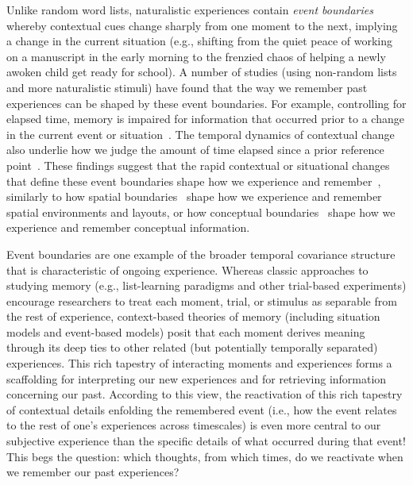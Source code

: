 \documentclass{article}
\begin{document}
Unlike random word lists, naturalistic experiences contain \textit{event boundaries} whereby contextual cues change sharply from one moment to the next, implying a change in the current situation (e.g., shifting from the quiet peace of working on a manuscript in the early morning to the frenzied chaos of helping a newly awoken child get ready for school).  A number of studies (using non-random lists and more naturalistic stimuli) have found that the way we remember past experiences can be shaped by these event boundaries.  For example, controlling for elapsed time, memory is impaired for information that occurred prior to a change in the current event or situation~\citep[e.g., ][]{RadvCope06, SwalEtal09, SwalEtal11, EzzyDava11, MannEtal16}.  The temporal dynamics of contextual change also underlie how we judge the amount of time elapsed since a prior reference point~\citep{BlocReed78, SahaSmit14}.  These findings suggest that the rapid contextual or situational changes that define these event boundaries shape how we experience and remember~\citep{DuBrDava16}, similarly to how spatial boundaries~\citep[e.g., environmental barriers;][]{McKeBuzs16, BrunEtal18} shape how we experience and remember spatial environments and layouts, or how conceptual boundaries~\citep[e.g., distinctions between semantic categories;][]{BrunEtal18} shape how we experience and remember conceptual information.

Event boundaries are one example of the broader temporal covariance structure that is characteristic of ongoing experience.  Whereas classic approaches to studying memory (e.g., list-learning paradigms and other trial-based experiments) encourage researchers to treat each moment, trial, or stimulus as separable from the rest of experience, context-based theories of memory (including situation models and event-based models) posit that each moment derives meaning through its deep ties to other related (but potentially temporally separated) experiences.  This rich tapestry of interacting moments and experiences forms a scaffolding for interpreting our new experiences and for retrieving information concerning our past.  According to this view, the reactivation of this rich tapestry of contextual details enfolding the remembered event (i.e., how the event relates to the rest of one's experiences across timescales) is even more central to our subjective experience than the specific details of what occurred during that event!  This begs the question: which thoughts, from which times, do we reactivate when we remember our past experiences?
\end{document}
